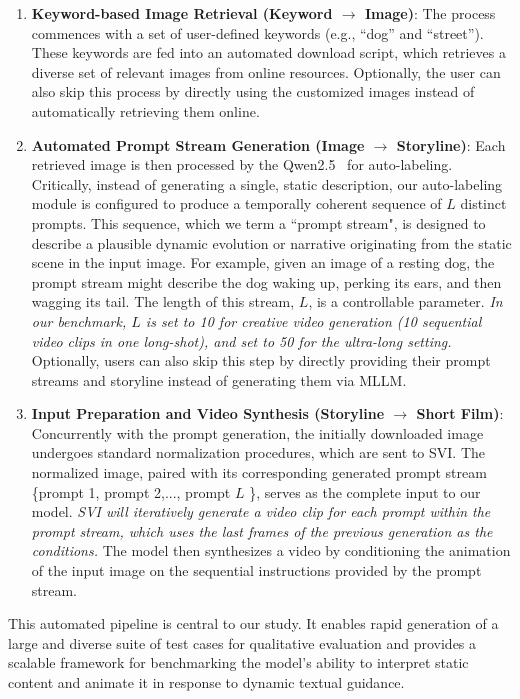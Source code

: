 \documentclass{article} %
\begin{document}
\begin{enumerate}

\item \textbf{Keyword-based Image Retrieval (Keyword $\rightarrow$ Image)}: The process commences with a set of user-defined keywords (e.g., “dog” and “street”). These keywords are fed into an automated download script, which retrieves a diverse set of relevant images from online resources. Optionally, the user can also skip this process by directly using the customized images instead of automatically retrieving them online.

\item \textbf{Automated Prompt Stream Generation (Image $\rightarrow$ Storyline)}: Each retrieved image is then processed by the Qwen2.5~\citep{yang2024qwen2} for auto-labeling. Critically, instead of generating a single, static description, our auto-labeling module is configured to produce a temporally coherent sequence of $L$ distinct prompts. This sequence, which we term a ``prompt stream", is designed to describe a plausible dynamic evolution or narrative originating from the static scene in the input image. For example, given an image of a resting dog, the prompt stream might describe the dog waking up, perking its ears, and then wagging its tail. The length of this stream, $L$, is a controllable parameter. \emph{In our benchmark, $L$ is set to 10 for creative video generation (10 sequential video clips in one long-shot), and set to 50 for the ultra-long setting.} Optionally, users can also skip this step by directly providing their prompt streams and storyline instead of generating them via MLLM.

\item \textbf{Input Preparation and Video Synthesis (Storyline $\rightarrow$ Short Film)}: Concurrently with the prompt generation, the initially downloaded image undergoes standard normalization procedures, which are sent to SVI. The normalized image, paired with its corresponding generated prompt stream \{prompt 1, prompt 2,..., prompt $L$ \}, serves as the complete input to our model. \emph{SVI will iteratively generate a video clip for each prompt within the prompt stream, which uses the last frames of the previous generation as the conditions.} The model then synthesizes a video by conditioning the animation of the input image on the sequential instructions provided by the prompt stream.
\end{enumerate}

This automated pipeline is central to our study. It enables rapid generation of a large and diverse suite of test cases for qualitative evaluation and provides a scalable framework for benchmarking the model’s ability to interpret static content and animate it in response to dynamic textual guidance.
\end{document}
